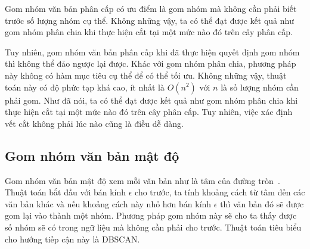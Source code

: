 Gom nhóm văn bản phân cấp có ưu điểm là gom nhóm mà không cần phải biết trước số lượng nhóm cụ thể.
Không những vậy, ta có thể đạt được kết quả như gom nhóm phân chia khi thực hiện cắt tại một mức nào đó trên cây phân cấp.

Tuy nhiên, gom nhóm văn bản phân cấp khi đã thực hiện quyết định gom nhóm thì không thể đảo ngược lại được.
Khác với gom nhóm phân chia, phương pháp này không có hàm mục tiêu cụ thể để có thể tối ưu.
Không những vậy, thuật toán này có độ phức tạp khá cao, ít nhất là $O(n^2)$ với $n$ là số lượng nhóm cần phải gom.
Như đã nói, ta có thể đạt được kết quả như gom nhóm phân chia khi thực hiện cắt tại một mức nào đó trên cây phân cấp.
Tuy nhiên, việc xác định vết cắt không phải lúc nào cũng là điều dễ dàng.
%

\subsection{Gom nhóm văn bản mật độ} 
Gom nhóm văn bản mật độ xem mỗi văn bản như là tâm của đường tròn~\cite{Manojit-Nandi}.
Thuật toán bắt đầu với bán kính $\epsilon$ cho trước, ta tính khoảng cách từ tâm đến các văn bản khác và nếu khoảng cách này nhỏ hơn bán kính $\epsilon$ thì văn bản đó sẽ được gom lại vào thành một nhóm.
Phương pháp gom nhóm này sẽ cho ta thấy được số nhóm sẽ có trong ngữ liệu mà không cần phải cho trước.
Thuật toán tiêu biểu cho hướng tiếp cận này là DBSCAN.

